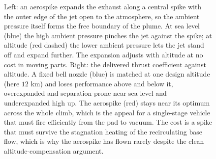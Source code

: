 \begin{figure}[htbp]
\caption[The altitude-compensating aerospike nozzle]{Left: an aerospike
expands the exhaust along a central spike with the outer edge of the jet
open to the atmosphere, so the ambient pressure itself forms the free
boundary of the plume. At sea level (blue) the high ambient pressure
pinches the jet against the spike; at altitude (red dashed) the lower
ambient pressure lets the jet stand off and expand further. The
expansion adjusts with altitude at no cost in moving parts. Right: the
delivered thrust coefficient against altitude. A fixed bell nozzle
(blue) is matched at one design altitude (here $12$ km) and loses
performance above and below it, overexpanded and separation-prone near
sea level and underexpanded high up. The aerospike (red) stays near its
optimum across the whole climb, which is the appeal for a single-stage
vehicle that must fire efficiently from the pad to vacuum. The cost is a
spike that must survive the stagnation heating of the recirculating base
flow, which is why the aerospike has flown rarely despite the clean
altitude-compensation argument.}
\label{fig:vol03ch13:aerospike}
\end{figure}
